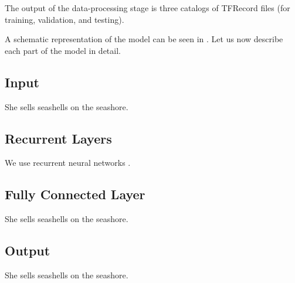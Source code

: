 
The output of the data-processing stage is three catalogs of TFRecord files (for
training, validation, and testing).

A schematic representation of the model can be seen in . Let us now
describe each part of the model in detail.

\subsection{Input}
She sells seashells on the seashore.

\subsection{Recurrent Layers}
We use recurrent neural networks \cite{goodfellow2016}.

\subsection{Fully Connected Layer}
She sells seashells on the seashore.

\subsection{Output}
She sells seashells on the seashore.
